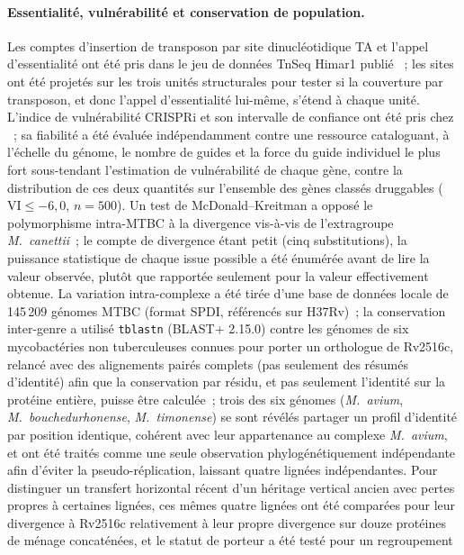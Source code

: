 \documentclass[11pt,a4paper]{article}
\begin{document}
\paragraph{Essentialité, vulnérabilité et conservation de population.} Les comptes d'insertion de
transposon par site dinucléotidique TA et l'appel d'essentialité ont été pris dans le jeu de
données TnSeq Himar1 publié \citep{dejesus2017essentiality}~; les sites ont été projetés sur les
trois unités structurales pour tester si la couverture par transposon, et donc l'appel
d'essentialité lui-même, s'étend à chaque unité. L'indice de vulnérabilité CRISPRi et son
intervalle de confiance ont été pris chez \citet{bosch2021vulnerability}~; sa fiabilité a été
évaluée indépendamment contre une ressource cataloguant, à l'échelle du génome, le nombre de guides
et la force du guide individuel le plus fort sous-tendant l'estimation de vulnérabilité de chaque
gène, contre la distribution de ces deux quantités sur l'ensemble des gènes classés druggables
($\text{VI}\leq-6,0$, $n=500$). Un test de McDonald--Kreitman a opposé le polymorphisme intra-MTBC à
la divergence vis-à-vis de l'extragroupe \textit{M.\ canettii}~; le compte de divergence étant petit
(cinq substitutions), la puissance statistique de chaque issue possible a été énumérée avant de lire
la valeur observée, plutôt que rapportée seulement pour la valeur effectivement obtenue. La
variation intra-complexe a été tirée d'une base de données locale
de 145\,209 génomes MTBC (format SPDI, référencés sur H37Rv)~; la conservation inter-genre a
utilisé \texttt{tblastn} (BLAST+ 2.15.0) contre les génomes de six mycobactéries non tuberculeuses
connues pour porter un orthologue de Rv2516c, relancé avec des alignements pairés complets (pas
seulement des résumés d'identité) afin que la conservation par résidu, et pas seulement l'identité
sur la protéine entière, puisse être calculée~; trois des six génomes (\textit{M.\ avium},
\textit{M.\ bouchedurhonense}, \textit{M.\ timonense}) se sont révélés partager un profil
d'identité par position identique, cohérent avec leur appartenance au complexe \textit{M.\ avium},
et ont été traités comme une seule observation phylogénétiquement indépendante afin d'éviter la
pseudo-réplication, laissant quatre lignées indépendantes. Pour distinguer un transfert horizontal
récent d'un héritage vertical ancien avec pertes propres à certaines lignées, ces mêmes quatre
lignées ont été comparées pour leur divergence à Rv2516c relativement à leur propre divergence sur
douze protéines de ménage concaténées, et le statut de porteur a été testé pour un regroupement
\end{document}
